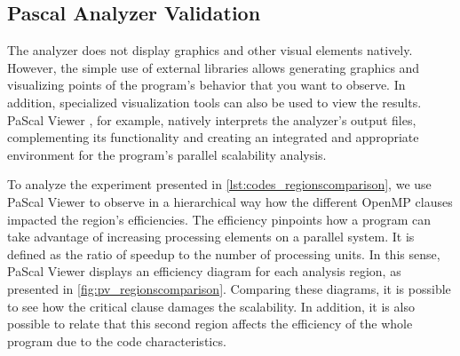 \begin{table}[H]
	\caption{Dataframe generated automatically from collected samples using the Python API.}
	\label{tab:regtable_dedup}
	
\end{table}

\subsection{Pascal Analyzer Validation}\label{sec:results_pascal}

The analyzer does not display graphics and other visual elements natively. However, the simple use of external libraries allows generating graphics and visualizing points of the program's behavior that you want to observe. In addition, specialized visualization tools can also be used to view the results. PaScal Viewer \cite{Silva2018}, for example, natively interprets the analyzer's output files, complementing its functionality and creating an integrated and appropriate environment for the program's parallel scalability analysis.

To analyze the experiment presented in \cref{lst:codes_regionscomparison}, we use PaScal Viewer to observe in a hierarchical way how the different OpenMP clauses impacted the region's efficiencies. The efficiency pinpoints how a program can take advantage of increasing processing elements on a parallel system. It is defined as the ratio of speedup to the number of processing units. In this sense, PaScal Viewer displays an efficiency diagram for each analysis region, as presented in \cref{fig:pv_regionscomparison}. Comparing these diagrams, it is possible to see how the critical clause damages the scalability. In addition, it is also possible to relate that this second region affects the efficiency of the whole program due to the code characteristics.

